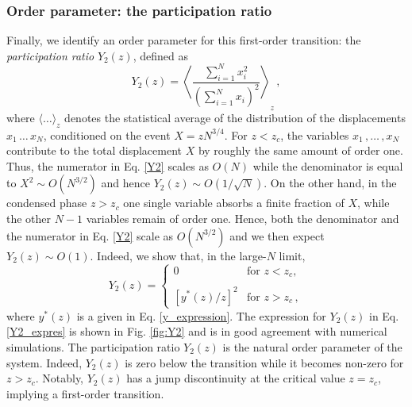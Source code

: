 \documentclass[aps,pre,twocolumn,superscriptaddress,showpacs]{revtex4-1}
\newcommand{\be}{\begin{equation}}
\newcommand{\ee}{\end{equation}}
\begin{document}
\subsubsection{Order parameter: the participation ratio}
Finally, we identify an order parameter for this first-order transition: the \emph{participation ratio} $Y_2(z)$, defined as
\be
Y_2(z)=\left\langle \frac{\sum_{i=1}^{N}x_i^2}{\left(\sum_{i=1}^{N}x_i\right)^2}\right\rangle_z\,,
\label{Y2}
\ee
where $\langle\ldots\rangle_z$ denotes the statistical average of the distribution of the displacements $x_1\,\ldots\,x_N$, conditioned on the event $X=z N^{3/4}$. For $z<z_c$, the variables $x_1\,,\ldots\,,x_N$ contribute to the total displacement $X$ by roughly the same amount of order one. Thus, the numerator in Eq. \eqref{Y2} scales as $O(N)$ while the denominator is equal to $X^2\sim O(N^{3/2})$ and hence $Y_2(z)\sim O(1/\sqrt{N})$.  On the other hand, in the condensed phase $z>z_c$ one single variable absorbs a finite fraction of $X$, while the other $N-1$ variables remain of order one. Hence, both the denominator and the numerator in Eq. \eqref{Y2} scale as $O(N^{3/2})$ and we then expect $Y_2(z)\sim O(1)$. Indeed, we show that, in the large-$N$ limit,
\begin{equation}
Y_2(z)=\begin{cases}
0 & \text{for } z<z_c,\\
\\
\left[y^*(z)/z\right]^2 & \text{for } z>z_c\,,
\end{cases}
\label{Y2_expres}
\end{equation}
where $y^*(z)$ is a given in Eq. \eqref{y_expression}. The expression for $Y_2(z)$ in Eq. \eqref{Y2_expres} is shown in Fig. \ref{fig:Y2} and is in good agreement with numerical simulations. The participation ratio $Y_2(z)$ is the natural order parameter of the system. Indeed, $Y_2(z)$ is zero below the transition while it becomes non-zero for $z>z_c$. Notably, $Y_2(z)$ has a jump discontinuity at the critical value $z=z_c$, implying a first-order transition.
\end{document}
